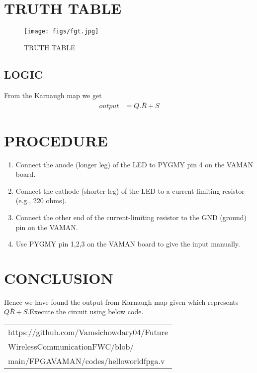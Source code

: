 \documentclass[journal,12pt,twocolumn]{IEEEtran}
\begin{document}
\section{TRUTH TABLE}
\begin{figure}[H]
\centering
\texttt{[image: figs/fgt.jpg]}
\caption{TRUTH TABLE}
\label{fig:fgt.jpg}
\end{figure}

\subsection{LOGIC}
From the Karnaugh map  we get
\begin{align}
  output&=Q.\overline{R}+S
\end{align}

\section{PROCEDURE}
\begin{enumerate}
\item Connect the anode (longer leg) of the LED to PYGMY pin 4 on the VAMAN board.
\item Connect the cathode (shorter leg) of the LED to a current-limiting resistor (e.g., 220 ohms).
\item Connect the other end of the current-limiting resistor to the GND (ground) pin on the VAMAN.
\item Use PYGMY pin 1,2,3 on the VAMAN board to give the input manually.
\end{enumerate}

\section{CONCLUSION}
Hence we have found the output from  Karnaugh map given which represents $Q\overline{R}+S$.Execute the circuit using below code.

   \begin{tabularx}{0.46\textwidth} { 
  | >{\centering\arraybackslash}X |}
  \hline
https://github.com/Vamsichowdary04/Future\\\-Wireless\-Communication\-FWC\-/blob/\\main/FPGAVAMAN/codes/helloworldfpga.v\\
  \hline
\end{tabularx}


\end{document}
